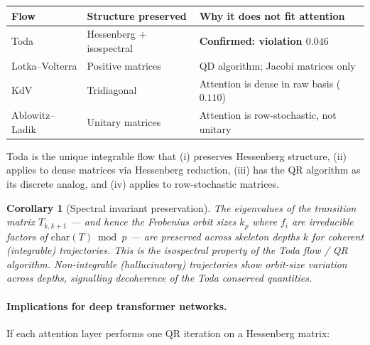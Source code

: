 \documentclass[11pt]{amsart}
\newtheorem{corollary}[theorem]{Corollary}
\theoremstyle{definition}
\begin{document}
\begin{center}
\renewcommand{\arraystretch}{1.2}
\begin{tabular}{@{}lll@{}}
\toprule
Flow & Structure preserved & Why it does not fit attention \\
\midrule
Toda & Hessenberg + isospectral & \textbf{Confirmed: violation $0.046$} \\
Lotka--Volterra & Positive matrices & QD algorithm; Jacobi matrices only \\
KdV & Tridiagonal & Attention is dense in raw basis ($0.110$) \\
Ablowitz--Ladik & Unitary matrices & Attention is row-stochastic, not unitary \\
\bottomrule
\end{tabular}
\end{center}

Toda is the unique integrable flow that (i) preserves Hessenberg structure,
(ii) applies to dense matrices via Hessenberg reduction,
(iii) has the QR algorithm as its discrete analog,
and (iv) applies to row-stochastic matrices.

\begin{corollary}[Spectral invariant preservation]
\label{cor:spectral-preservation}
The eigenvalues of the transition matrix $T_{k,k+1}$ ---
and hence the Frobenius orbit sizes $k_p$
where $f_i$ are irreducible factors of $\mathrm{char}(T) \bmod p$ ---
are preserved across skeleton depths $k$ for coherent (integrable) trajectories.
This is the isospectral property of the Toda flow / QR algorithm.
Non-integrable (hallucinatory) trajectories show orbit-size variation
across depths, signalling decoherence of the Toda conserved quantities.
\end{corollary}

\paragraph{Implications for deep transformer networks.}
If each attention layer performs one QR iteration on a Hessenberg matrix:
\end{document}
